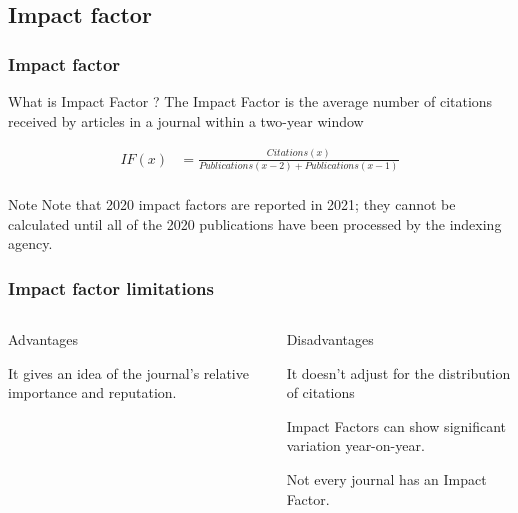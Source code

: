 \documentclass{beamer}
\begin{document}
\subsection{Impact factor}
\begin{frame}
    \frametitle{Impact factor}

        \begin{block}{What is Impact Factor ?}
        The Impact Factor is the average number of citations received by articles in a journal within a two-year window
    \end{block}
    \begin{align*}
        IF(x) &= \frac{ Citations(x)}{ Publications(x - 2 ) +  Publications(x - 1) }\\
    \end{align*}
    
    \begin{alertblock}{Note}
      Note that 2020 impact factors are reported in 2021; they cannot be calculated until all of the 2020 publications have been processed by the indexing agency.
    \end{alertblock}


\end{frame}
\begin{frame}
    \frametitle{Impact factor limitations}
    \begin{columns}[T]
        \begin{column}{.5\textwidth} \pause
            \centering Advantages
            \begin{propslist}
                \item It gives an idea of the journal’s relative importance and reputation. \pause
            \end{propslist}
        \end{column}
        \begin{column}{.5\textwidth}
            \centering Disadvantages %
            \begin{conslist}
                \item It doesn’t adjust for the distribution of citations \pause
                \item Impact Factors can show significant variation year-on-year.  \pause
                \item Not every journal has an Impact Factor.  \pause
            \end{conslist}
        \end{column}
    \end{columns}
\end{frame}
\end{document}
